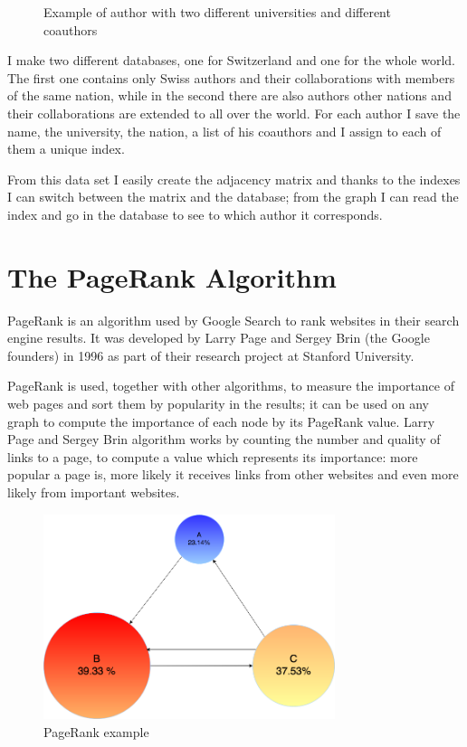 \documentclass[]{usiinfbachelorproject}
\begin{document}
\begin{figure}
\begin{center}
\begin{tikzpicture}[x=0.75pt,y=0.75pt,yscale=-0.7,xscale=0.7]
\end{tikzpicture}
\caption{Example of author with two different universities and different coauthors} \label{fig:twoUni}
\end{center}
\end{figure}

I make two different databases, one for Switzerland and one for the whole world. The first one contains only Swiss authors and their collaborations with members of the same nation, while in the second there are also authors other nations and their collaborations are extended to all over the world. For each author I save the name, the university, the nation, a list of his coauthors and I assign to each of them a unique index. 

From this data set I easily create the adjacency matrix and thanks to the indexes I can switch between the matrix and the database; from the graph I can read the index and go in the database to see to which author it corresponds.





\section{The PageRank Algorithm} \label{sec:pagerank} 
PageRank is an algorithm used by Google Search to rank websites in their search engine results. It was developed by  Larry Page and  Sergey Brin (the Google founders) in 1996 as part of their research project at Stanford University.

PageRank is used, together with other algorithms, to measure the importance of web pages and sort them by popularity in the results; it can be used on any graph to compute the importance of each node by its PageRank value. Larry Page and  Sergey Brin algorithm works by counting the number and quality of links to a page, to compute a value which represents its importance: more popular a page is, more likely it receives links from other websites and even more likely from important websites.

\begin{figure}[ht]
	\centering
	\includegraphics[height=6cm]{img/page_rank_example.png}
	\caption{PageRank example}
	\label{fig:prexample}
\end{figure}
\end{document}
